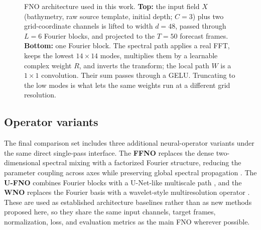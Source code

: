 \begin{figure}[H]
\caption{FNO architecture used in this work. \textbf{Top:} the input field $X$ (bathymetry, raw source template, initial depth; $C{=}3$) plus two grid-coordinate channels is lifted to width $d{=}48$, passed through $L{=}6$ Fourier blocks, and projected to the $T{=}50$ forecast frames. \textbf{Bottom:} one Fourier block. The spectral path applies a real FFT, keeps the lowest $14{\times}14$ modes, multiplies them by a learnable complex weight $R$, and inverts the transform; the local path $W$ is a $1{\times}1$ convolution. Their sum passes through a GELU. Truncating to the low modes is what lets the same weights run at a different grid resolution.}
\label{fig:fno-arch}
\end{figure}

\subsection{Operator variants}
\label{subsec:operator-variants}

The final comparison set includes three additional neural-operator variants under the same direct single-pass interface. The \textbf{FFNO} replaces the dense two-dimensional spectral mixing with a factorized Fourier structure, reducing the parameter coupling across axes while preserving global spectral propagation \citep{tran2023ffno}. The \textbf{U-FNO} combines Fourier blocks with a U-Net-like multiscale path \citep{wen2022ufno}, and the \textbf{WNO} replaces the Fourier basis with a wavelet-style multiresolution operator \citep{tripura2023wno}. These are used as established architecture baselines rather than as new methods proposed here, so they share the same input channels, target frames, normalization, loss, and evaluation metrics as the main FNO wherever possible.

